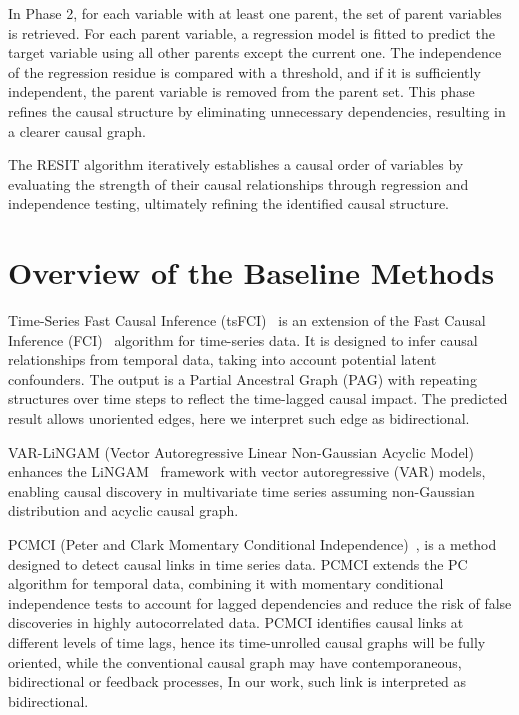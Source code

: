 In Phase 2, for each variable with at least one parent, the set of parent variables is retrieved. For each parent variable, a regression model is fitted to predict the target variable using all other parents except the current one. The independence of the regression residue is compared with a threshold, and if it is sufficiently independent, the parent variable is removed from the parent set. This phase refines the causal structure by eliminating unnecessary dependencies, resulting in a clearer causal graph.

The RESIT algorithm iteratively establishes a causal order of variables by evaluating the strength of their causal relationships through regression and independence testing, ultimately refining the identified causal structure.






\section{Overview of the Baseline Methods}
\label{appsec:baseline_methods}


Time-Series Fast Causal Inference (tsFCI)~\citep{entner2010causal} is an extension of the Fast Causal Inference (FCI)~\citep{spirtes2013causal} algorithm for time-series data. It is designed to infer causal relationships from temporal data, taking into account potential latent confounders. The output is a Partial Ancestral Graph (PAG) with repeating structures over time steps to reflect the time-lagged causal impact. The predicted result allows unoriented edges, here we interpret such edge as bidirectional.

VAR-LiNGAM (Vector Autoregressive Linear Non-Gaussian Acyclic Model)~\citep{hyvarinen2010estimation} enhances the LiNGAM~\citep{shimizu2006linear} framework with vector autoregressive (VAR) models, enabling causal discovery in multivariate time series assuming non-Gaussian distribution and acyclic causal graph. 

PCMCI (Peter and Clark Momentary Conditional Independence)~\citep{runge2019detecting}, is a method designed to detect causal links in time series data. PCMCI extends the PC algorithm for temporal data, combining it with momentary conditional independence tests to account for lagged dependencies and reduce the risk of false discoveries in highly autocorrelated data. PCMCI identifies causal links at different levels of time lags, hence its time-unrolled causal graphs will be fully oriented, while the conventional causal graph may have contemporaneous, bidirectional or feedback processes, In our work, such link is interpreted as bidirectional.


